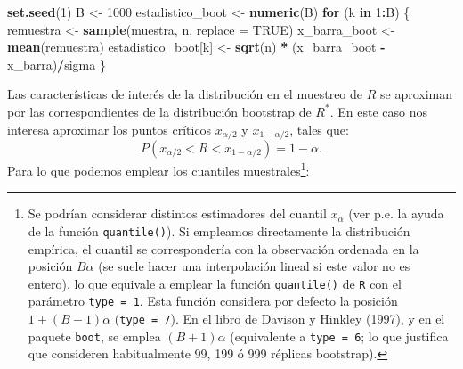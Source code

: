 \documentclass[]{book}
\newenvironment{Shaded}{\begin{snugshade}}{\end{snugshade}}
\newcommand{\KeywordTok}[1]{\textcolor[rgb]{0.13,0.29,0.53}{\textbf{#1}}}
\newcommand{\DataTypeTok}[1]{\textcolor[rgb]{0.13,0.29,0.53}{#1}}
\newcommand{\DecValTok}[1]{\textcolor[rgb]{0.00,0.00,0.81}{#1}}
\newcommand{\StringTok}[1]{\textcolor[rgb]{0.31,0.60,0.02}{#1}}
\newcommand{\OtherTok}[1]{\textcolor[rgb]{0.56,0.35,0.01}{#1}}
\newcommand{\ControlFlowTok}[1]{\textcolor[rgb]{0.13,0.29,0.53}{\textbf{#1}}}
\newcommand{\OperatorTok}[1]{\textcolor[rgb]{0.81,0.36,0.00}{\textbf{#1}}}
\newcommand{\NormalTok}[1]{#1}
\let\rmarkdownfootnote\footnote%
\def\footnote{\protect\rmarkdownfootnote}
\theoremstyle{definition}
\theoremstyle{definition}
\theoremstyle{definition}
\theoremstyle{remark}
\begin{document}
\begin{Shaded}
\begin{Highlighting}[]
\KeywordTok{set.seed}\NormalTok{(}\DecValTok{1}\NormalTok{)}
\NormalTok{B <-}\StringTok{ }\DecValTok{1000}
\NormalTok{estadistico_boot <-}\StringTok{ }\KeywordTok{numeric}\NormalTok{(B)}
\ControlFlowTok{for}\NormalTok{ (k }\ControlFlowTok{in} \DecValTok{1}\OperatorTok{:}\NormalTok{B) \{}
\NormalTok{    remuestra <-}\StringTok{ }\KeywordTok{sample}\NormalTok{(muestra, n, }\DataTypeTok{replace =} \OtherTok{TRUE}\NormalTok{)}
\NormalTok{    x_barra_boot <-}\StringTok{ }\KeywordTok{mean}\NormalTok{(remuestra)}
\NormalTok{    estadistico_boot[k] <-}\StringTok{ }\KeywordTok{sqrt}\NormalTok{(n) }\OperatorTok{*}\StringTok{ }\NormalTok{(x_barra_boot }\OperatorTok{-}\StringTok{ }\NormalTok{x_barra)}\OperatorTok{/}\NormalTok{sigma}
\NormalTok{\}}
\end{Highlighting}
\end{Shaded}

Las características de interés de la distribución en el muestreo de
\(R\) se aproximan por las correspondientes de la distribución bootstrap
de \(R^{\ast}\). En este caso nos interesa aproximar los puntos críticos
\(x_{\alpha /2}\) y \(x_{1-\alpha /2}\), tales que:
\[P\left( x_{\alpha /2} < R < x_{1-\alpha /2} \right) = 1-\alpha.\] Para
lo que podemos emplear los cuantiles muestrales\footnote{Se podrían
  considerar distintos estimadores del cuantil \(x_{\alpha}\) (ver p.e.
  la ayuda de la función \texttt{quantile()}). Si empleamos directamente
  la distribución empírica, el cuantil se correspondería con la
  observación ordenada en la posición \(B \alpha\) (se suele hacer una
  interpolación lineal si este valor no es entero), lo que equivale a
  emplear la función \texttt{quantile()} de \texttt{R} con el parámetro
  \texttt{type\ =\ 1}. Esta función considera por defecto la posición
  \(1 + (B - 1) \alpha\) (\texttt{type\ =\ 7}). En el libro de Davison y
  Hinkley (1997), y en el paquete \texttt{boot}, se emplea
  \((B + 1) \alpha\) (equivalente a \texttt{type\ =\ 6}; lo que
  justifica que consideren habitualmente 99, 199 ó 999 réplicas
  bootstrap).}:
\end{document}
